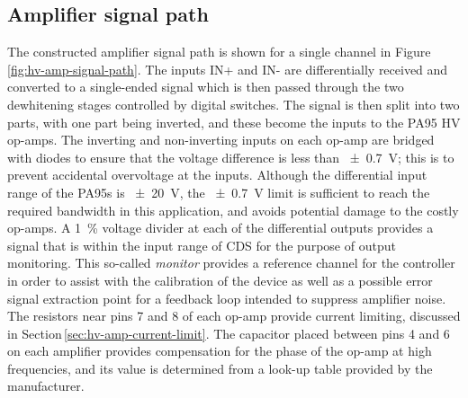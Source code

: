 \subsection{Amplifier signal path}
The constructed amplifier signal path is shown for a single channel in Figure\,\ref{fig:hv-amp-signal-path}. The inputs IN+ and IN- are differentially received and converted to a single-ended signal which is then passed through the two dewhitening stages controlled by digital switches. The signal is then split into two parts, with one part being inverted, and these become the inputs to the PA95 \gls{HV} op-amps. The inverting and non-inverting inputs on each op-amp are bridged with diodes to ensure that the voltage difference is less than \SI{\pm0.7}{\volt}; this is to prevent accidental overvoltage at the inputs. Although the differential input range of the PA95s is \SI{\pm20}{\volt}, the \SI{\pm0.7}{\volt} limit is sufficient to reach the required bandwidth in this application, and avoids potential damage to the costly op-amps. A \SI{1}{\percent} voltage divider at each of the differential outputs provides a signal that is within the input range of \gls{CDS} for the purpose of output monitoring. This so-called \emph{monitor} provides a reference channel for the controller in order to assist with the calibration of the device as well as a possible error signal extraction point for a feedback loop intended to suppress amplifier noise. The resistors near pins 7 and 8 of each op-amp provide current limiting, discussed in Section\,\ref{sec:hv-amp-current-limit}. The capacitor placed between pins 4 and 6 on each amplifier provides compensation for the phase of the op-amp at high frequencies, and its value is determined from a look-up table provided by the manufacturer.

